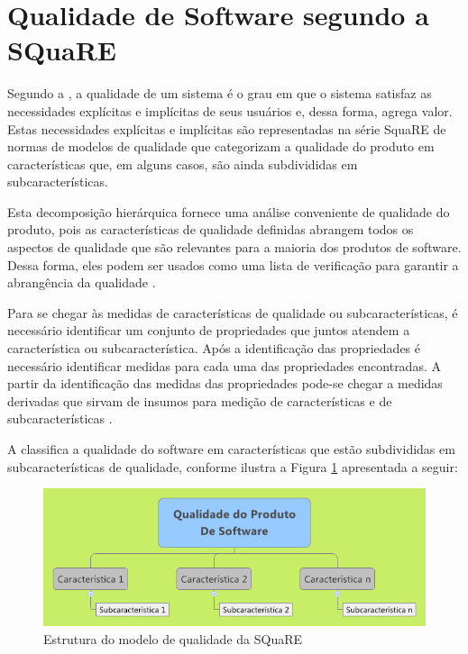 \section{Qualidade de Software segundo a SQuaRE}

Segundo a , a qualidade de um sistema é o grau em que o sistema satisfaz as necessidades explícitas e implícitas de seus usuários e, dessa forma, agrega valor. Estas necessidades explícitas e implícitas são representadas na série SquaRE de normas de modelos de qualidade que categorizam a qualidade do produto em características que, em alguns casos, são ainda subdivididas em subcaracterísticas.						

Esta decomposição hierárquica fornece uma análise conveniente de qualidade do produto, pois as características de qualidade definidas abrangem todos os aspectos de qualidade que são relevantes para a maioria dos produtos de software. Dessa forma, eles podem ser usados como uma lista de verificação para garantir a abrangência da qualidade \cite{iso_25010}.

Para se chegar às medidas de características de qualidade ou subcaracterísticas, é necessário identificar um conjunto de propriedades que juntos atendem a característica ou subcaracterística. Após a identificação das propriedades é necessário identificar medidas para cada uma das propriedades encontradas. A partir da identificação das medidas das propriedades pode-se chegar a medidas derivadas que sirvam de insumos para medição de características e de subcaracterísticas \cite{iso_25010}.

A   classifica a qualidade do software em características que estão subdivididas em subcaracterísticas de qualidade, conforme ilustra a Figura \ref{QualProdSoft} apresentada a seguir: 

\begin{figure}[!ht]
\centering
\includegraphics[keepaspectratio=true,scale=0.6]{figuras/qualidade.png}
\caption{Estrutura do modelo de qualidade da SQuaRE \cite{iso_25010}}
\label{QualProdSoft}
\end{figure}

